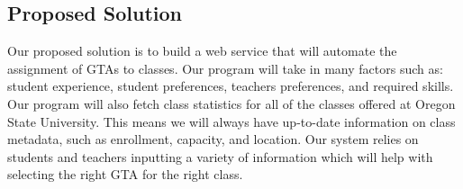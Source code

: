 \subsection{Proposed Solution}

Our proposed solution is to build a web service that will automate the assignment of GTAs to classes. 
Our program will take in many factors such as: student experience, student preferences, teachers preferences, and required skills. 
Our program will also fetch class statistics for all of the classes offered at Oregon State University. 
This means we will always have up-to-date information on class metadata, such as enrollment, capacity, and location. 
Our system relies on students and teachers inputting a variety of information which will help with selecting the right GTA for the right class.
